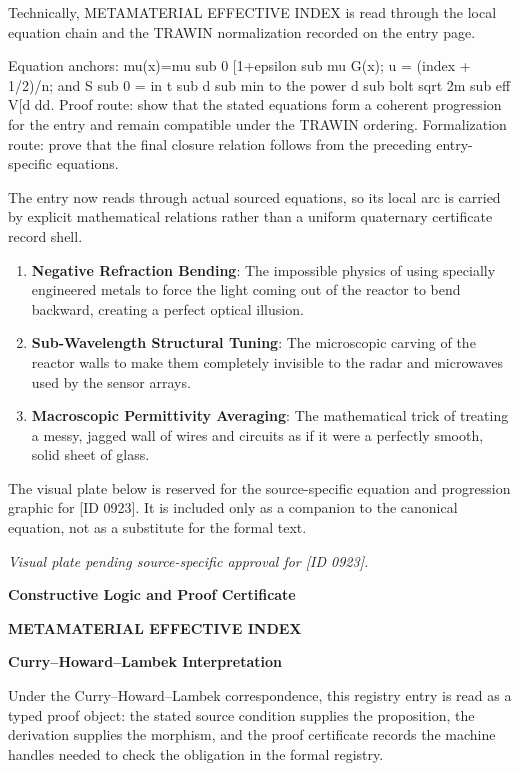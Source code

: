 Technically, METAMATERIAL EFFECTIVE INDEX is read through the local equation chain and the TRAWIN normalization recorded on the entry page.

Equation anchors: mu(x)=mu sub 0 [1+epsilon sub mu G(x); u = (index + 1/2)/n; and S sub 0 = in t sub d sub min to the power d sub bolt sqrt 2m sub eff V[d dd. Proof route: show that the stated equations form a coherent progression for the entry and remain compatible under the TRAWIN ordering. Formalization route: prove that the final closure relation follows from the preceding entry-specific equations.

The entry now reads through actual sourced equations, so its local arc is carried by explicit mathematical relations rather than a uniform quaternary certificate record shell.
\endgroup

\begin{enumerate}[leftmargin=1.6em,itemsep=6pt,topsep=4pt]
\item \textbf{Negative Refraction Bending}: The impossible physics of using specially engineered metals to force the light coming out of the reactor to bend backward, creating a perfect optical illusion.
\item \textbf{Sub-Wavelength Structural Tuning}: The microscopic carving of the reactor walls to make them completely invisible to the radar and microwaves used by the sensor arrays.
\item \textbf{Macroscopic Permittivity Averaging}: The mathematical trick of treating a messy, jagged wall of wires and circuits as if it were a perfectly smooth, solid sheet of glass.
\end{enumerate}

\begingroup\footnotesize\sloppy
The visual plate below is reserved for the source-specific equation and progression graphic for [ID 0923]. It is included only as a companion to the canonical equation, not as a substitute for the formal text.
\par\endgroup
\begingroup\footnotesize\itshape
Visual plate pending source-specific approval for [ID 0923].
\par\endgroup

\clearpage
\begingroup\tzpsupportsetup
\noindent\textbf{\fontsize{10.8pt}{12.8pt}\selectfont [ID 0923] Constructive Logic and Proof Certificate}\par
\noindent\textbf{\fontsize{10pt}{12pt}\selectfont METAMATERIAL EFFECTIVE INDEX}\par
\vspace{0.45em}
\begingroup
\footnotesize
\setlength{\parskip}{0.22em}
\setlength{\parindent}{0pt}
\noindent\textbf{Curry--Howard--Lambek Interpretation}\par
Under the Curry--Howard--Lambek correspondence, this registry entry is read as a typed proof
object: the stated source condition supplies the proposition, the derivation supplies the
morphism, and the proof certificate records the machine handles needed to check the obligation
in the formal registry.

